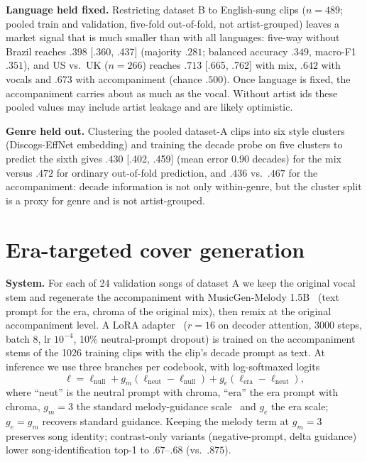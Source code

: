 \documentclass[10pt,twocolumn]{article}
\begin{document}
\textbf{Language held fixed.} Restricting dataset B to English-sung clips ($n{=}489$; pooled train and validation, five-fold out-of-fold, not artist-grouped) leaves a market signal that is much smaller than with all languages: five-way without Brazil reaches $.398$ [.360, .437] (majority $.281$; balanced accuracy $.349$, macro-F1 $.351$), and US vs.\ UK ($n{=}266$) reaches $.713$ [.665, .762] with mix, $.642$ with vocals and $.673$ with accompaniment (chance $.500$). Once language is fixed, the accompaniment carries about as much as the vocal. Without artist ids these pooled values may include artist leakage and are likely optimistic.

\textbf{Genre held out.} Clustering the pooled dataset-A clips into six style clusters (Discogs-EffNet embedding) and training the decade probe on five clusters to predict the sixth gives $.430$ [.402, .459] (mean error $0.90$ decades) for the mix versus $.472$ for ordinary out-of-fold prediction, and $.436$ vs.\ $.467$ for the accompaniment: decade information is not only within-genre, but the cluster split is a proxy for genre and is not artist-grouped.

\section{Era-targeted cover generation}\label{sec:gen}
\textbf{System.} For each of 24 validation songs of dataset A we keep the original vocal stem and regenerate the accompaniment with MusicGen-Melody 1.5B~\cite{copet2023musicgen} (text prompt for the era, chroma of the original mix), then remix at the original accompaniment level. A LoRA adapter~\cite{hu2021lora} ($r{=}16$ on decoder attention, 3000 steps, batch 8, lr $10^{-4}$, 10\% neutral-prompt dropout) is trained on the accompaniment stems of the 1026 training clips with the clip's decade prompt as text. At inference we use three branches per codebook, with log-softmaxed logits
\[
\ell = \ell_{\text{null}} + g_m(\ell_{\text{neut}}-\ell_{\text{null}}) + g_e(\ell_{\text{era}}-\ell_{\text{neut}}),
\]
where ``neut'' is the neutral prompt with chroma, ``era'' the era prompt with chroma, $g_m{=}3$ the standard melody-guidance scale~\cite{ho2022cfg} and $g_e$ the era scale; $g_e{=}g_m$ recovers standard guidance. Keeping the melody term at $g_m{=}3$ preserves song identity; contrast-only variants (negative-prompt, delta guidance) lower song-identification top-1 to $.67$--$.68$ (vs.\ $.875$).
\end{document}
